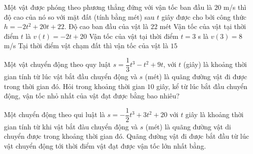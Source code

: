\begin{ex}%
	Một vật được phóng theo phương thẳng đứng với vận tốc ban đầu là $ 20 $ m/s thì độ cao của nó so với mặt đất (tính bằng mét) sau $t$ giây được  cho bởi công thức $h=-2t^2+20t+22$.
	 \choiceTF
		{\True Độ cao ban đầu của vật là $ 22  $ mét}
		{Vận tốc của vật tại thời  điểm $t$ là $v(t)=-2t+20$}
		{\True Vận tốc của vật tại  thời điểm $t=3$ s là $v(3)=8$ m/s}
		{Tại thời điểm vật chạm đất thì vận tốc của vật là $  15 $}
\end{ex}

\begin{ex}%
	Một vật chuyển động theo quy luật $s=\dfrac{1}{3}{t^3}-t^2+9t$, với $t$ (giây) là khoảng thời gian tính từ lúc vật bắt đầu chuyển động và $s$ (mét) là quãng đường vật đi được trong thời gian đó. Hỏi trong khoảng thời gian $ 10 $ giây, kể từ lúc bắt đầu chuyển động, vận tốc nhỏ nhất của vật đạt được bằng bao nhiêu? 
\end{ex}

\begin{ex}%
	Một chuyển động theo qui luật là $s=-\dfrac{1}{2}{t^3}+3t^2+20$ với $ t $ giây là khoảng thời gian tính từ khi vật bắt đàu chuyển động và $ s $ (mét) là quãng đường vật di chuyển được trong khoảng thời gian đó. Quãng đường vật đi được bắt đầu từ lúc vật chuyển động tới thời điểm vật đạt được  vận tốc lớn nhất bằng.
\end{ex}


